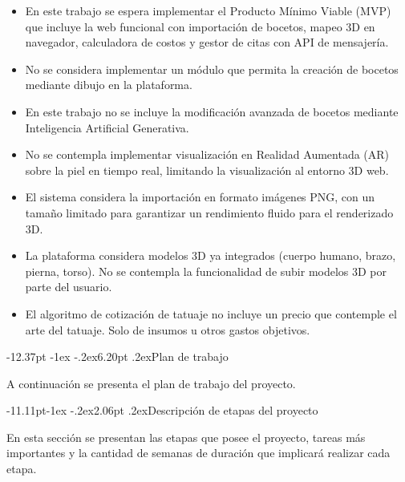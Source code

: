 \documentclass[12pt,letterpaper,oneside]{report}
\makeatletter
\renewcommand\section{\@startsection{section}{1}{\z@}%
  {-12.37pt \@plus -1ex \@minus -.2ex}{6.20pt \@plus.2ex}{\normalfont\large\bfseries}}
\renewcommand\subsection{\@startsection{subsection}{2}{\z@}%
  {-11.11pt\@plus -1ex \@minus -.2ex}{2.06pt \@plus .2ex}{\normalfont\normalsize\bfseries}}
\makeatother
\begin{document}
\begin{itemize}
  \item En este trabajo se espera implementar el Producto Mínimo Viable (MVP) que incluye la web funcional con importación de bocetos, mapeo 3D en navegador, calculadora de costos y gestor de citas con API de mensajería.
  \item No se considera implementar un módulo que permita la creación de bocetos mediante dibujo en la plataforma.
  \item En este trabajo no se incluye la modificación avanzada de bocetos mediante Inteligencia Artificial Generativa.
  \item No se contempla implementar visualización en Realidad Aumentada (AR) sobre la piel en tiempo real, limitando la visualización al entorno 3D web.
  \item El sistema considera la importación en formato imágenes PNG, con un tamaño limitado para garantizar un rendimiento fluido para el renderizado 3D.
  \item La plataforma considera modelos 3D ya integrados (cuerpo humano, brazo, pierna, torso). No se contempla la funcionalidad de subir modelos 3D por parte del usuario.
  \item El algoritmo de cotización de tatuaje no incluye un precio que contemple el arte del tatuaje. Solo de insumos u otros gastos objetivos.
\end{itemize}

\section{Plan de trabajo}
\label{sec:plantrabajo}

A continuación se presenta el plan de trabajo del proyecto.

\subsection{Descripción de etapas del proyecto}

En esta sección se presentan las etapas que posee el proyecto, tareas más importantes y la cantidad de semanas de duración que implicará realizar cada etapa.
\end{document}
